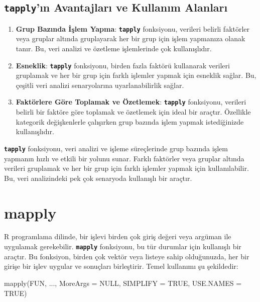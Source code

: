 \documentclass[
  letterpaper,
  DIV=11,
  numbers=noendperiod]{scrreprt}
\newenvironment{Shaded}{\begin{snugshade}}{\end{snugshade}}
\newcommand{\AttributeTok}[1]{\textcolor[rgb]{0.40,0.45,0.13}{#1}}
\newcommand{\ConstantTok}[1]{\textcolor[rgb]{0.56,0.35,0.01}{#1}}
\newcommand{\FunctionTok}[1]{\textcolor[rgb]{0.28,0.35,0.67}{#1}}
\newcommand{\NormalTok}[1]{\textcolor[rgb]{0.00,0.23,0.31}{#1}}
\begin{document}
\subsection{\texorpdfstring{\textbf{\texttt{tapply}'ın Avantajları ve
Kullanım
Alanları}}{tapply'ın Avantajları ve Kullanım Alanları}}\label{tapplyux131n-avantajlarux131-ve-kullanux131m-alanlarux131}

\begin{enumerate}
\def\labelenumi{\arabic{enumi}.}
\item
  \textbf{Grup Bazında İşlem Yapma}: \textbf{\texttt{tapply}}
  fonksiyonu, verileri belirli faktörler veya gruplar altında
  gruplayarak her bir grup için işlem yapmanıza olanak tanır. Bu, veri
  analizi ve özetleme işlemlerinde çok kullanışlıdır.
\item
  \textbf{Esneklik}: \textbf{\texttt{tapply}} fonksiyonu, birden fazla
  faktörü kullanarak verileri gruplamak ve her bir grup için farklı
  işlemler yapmak için esneklik sağlar. Bu, çeşitli veri analizi
  senaryolarına uyarlanabilirlik sağlar.
\item
  \textbf{Faktörlere Göre Toplamak ve Özetlemek}:
  \textbf{\texttt{tapply}} fonksiyonu, verileri belirli bir faktöre göre
  toplamak ve özetlemek için ideal bir araçtır. Özellikle kategorik
  değişkenlerle çalışırken grup bazında işlem yapmak istediğinizde
  kullanışlıdır.
\end{enumerate}

\textbf{\texttt{tapply}} fonksiyonu, veri analizi ve işleme süreçlerinde
grup bazında işlem yapmanın hızlı ve etkili bir yolunu sunar. Farklı
faktörler veya gruplar altında verileri gruplamak ve her bir grup için
farklı işlemler yapmak için kullanılabilir. Bu, veri analizindeki pek
çok senaryoda kullanışlı bir araçtır.

\section{mapply}\label{mapply}

R programlama dilinde, bir işlevi birden çok giriş değeri veya argüman
ile uygulamak gerekebilir. \textbf{\texttt{mapply}} fonksiyonu, bu tür
durumlar için kullanışlı bir araçtır. Bu fonksiyon, birden çok vektör
veya listeye sahip olduğunuzda, her bir girişe bir işlev uygular ve
sonuçları birleştirir. Temel kullanımı şu şekildedir:

\begin{Shaded}
\begin{Highlighting}[]
\FunctionTok{mapply}\NormalTok{(FUN, ..., }\AttributeTok{MoreArgs =} \ConstantTok{NULL}\NormalTok{, }\AttributeTok{SIMPLIFY =} \ConstantTok{TRUE}\NormalTok{, }\AttributeTok{USE.NAMES =} \ConstantTok{TRUE}\NormalTok{)}
\end{Highlighting}
\end{Shaded}
\end{document}
